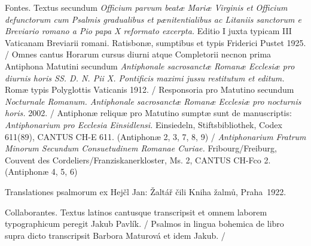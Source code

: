 \documentclass[a4paper, twoside, 12pt]{article}
\begin{document}
\pagebreak



\pagebreak






\fancyhead[LE]{\thepage\ / }
\fancyhead[RO]{ / \thepage}




\pagebreak

\pagestyle{empty}

\tableofcontents

\vfill

\pagebreak

Fontes. 
Textus secundum 
\textit{Officium parvum beatæ Mariæ Virginis et Officium
defunctorum cum Psalmis gradualibus et pænitentialibus ac Litaniis sanctorum
e Breviario romano a Pio papa X reformato excerpta.}
Editio I juxta typicam III Vaticanam Breviarii romani. 
Ratisbonæ, sumptibus et typis Friderici Pustet 1925. /
Omnes cantus Horarum cursus diurni atque Completorii 
necnon prima Antiphona Matutini secundum
\textit{Antiphonale sacrosanctæ Romanæ Ecclesiæ pro diurnis horis
SS. D. N. Pii X. Pontificis maximi jussu restitutum et editum.}
Romæ typis Polyglottis Vaticanis 1912. /
Responsoria pro Matutino secundum 
\textit{Nocturnale Romanum. Antiphonale sacrosanctæ Romanæ Ecclesiæ
pro nocturnis horis.}
2002. /
Antiphonæ reliquæ pro Matutino sumptæ sunt de manuscriptis:
\textit{Antiphonarium pro Ecclesia Einsidlensi.}
Einsiedeln, Stiftsbibliothek, Codex 611(89), CANTUS CH-E 611.
(Antiphonæ 2, 3, 7, 8, 9) /
\textit{Antiphonarium Fratrum Minorum Secundum Consuetudinem Romanae Curiae.}
Fribourg/Freiburg, Couvent des Cordeliers/Franziskanerkloster, Ms. 2,
CANTUS CH-Fco 2.
(Antiphonæ 4, 5, 6)

Translationes psalmorum ex
Hejčl Jan: Žaltář čili Kniha žalmů, Praha~1922.

Collaborantes.
Textus latinos cantusque transcripsit et omnem laborem typographicum peregit
Jakub Pavlík. /
Psalmos in lingua bohemica de libro supra dicto transcripsit
Barbora Maturová et idem Jakub. /
\end{document}

